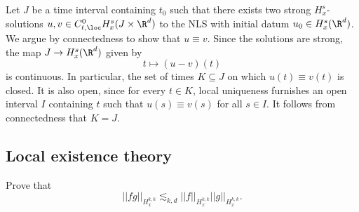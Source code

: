 \begin{solution}
	Let $J$ be a time interval containing $t_0$ such that there exists two strong $H^s_x$-solutions $u, v \in C^0_{t, \loc} H^s_x (J \times \R^d)$ to the NLS with initial datum $u_0 \in H^s_x (\R^d)$. We argue by connectedness to show that $u \equiv v$. 	Since the solutions are strong, the map $J \to H^s_x (\R^d)$ given by 
		\[ t \mapsto (u - v)(t) \]
	is continuous. In particular, the set of times $K \subseteq J$ on which $u(t) \equiv v(t)$ is closed. It is also open, since for every $t \in K$, local uniqueness furnishes an open interval $I$ containing $t$ such that $u(s) \equiv v(s)$ for all $s \in I$. It follows from connectedness that $K = J$. 
\end{solution}

\subsection{Local existence theory}

\begin{statement}
	Prove that 
		\[ ||fg ||_{H^{k, k}_x} \lesssim_{k, d} ||f||_{H^{k, k}_x} ||g||_{H^{k, k}_x}. \]
\end{statement}

